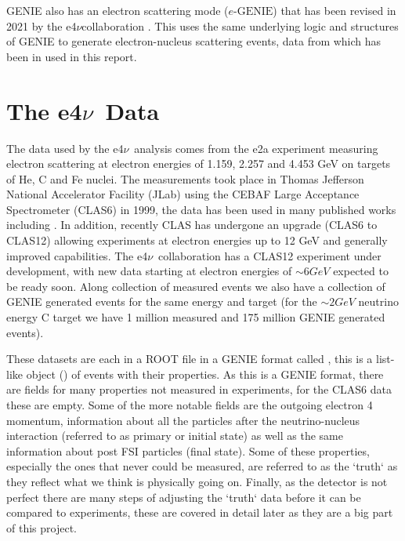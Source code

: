 \documentclass[a4paper,12pt]{article}
\newcommand{\efn}{e4$\nu$}
\newcommand{\eGEN}{$e\text{-GENIE}$}
\newcommand{\verbb}[1]{\text{\verb|#1}}
\begin{document}
GENIE also has an electron scattering mode (\eGEN) that has been revised in 2021 by the \efn collaboration \cite{e4ncollaborationInclusiveElectronScattering2021}.
This uses the same underlying logic and structures of GENIE to generate electron-nucleus scattering events, data from which has been in used in this report.

\section{The \efn\ Data}
The data used by the \efn\ analysis comes from the e2a experiment measuring electron scattering at electron energies of 1.159, 2.257 and 4.453 \si{GeV} on targets of He, C and Fe nuclei.
The measurements took place in Thomas Jefferson National Accelerator Facility (JLab) using the CEBAF Large Acceptance Spectrometer (CLAS6) \cite{meckingCEBAFLargeAcceptance2003} in 1999, the data has been used in many published works including \cite{khachatryanElectronbeamEnergyReconstruction2021}.
In addition, recently CLAS has undergone an upgrade (CLAS6 to CLAS12) \cite{burkertCLAS12SpectrometerJefferson2020} allowing experiments at electron energies up to 12 \si{GeV} and generally improved capabilities.
The \efn\ collaboration has a CLAS12 experiment under development, with new data starting at electron energies of $\sim6 \si{GeV}$ expected to be ready soon.
Along collection of measured events we also have a collection of GENIE generated events for the same energy and target (for the $\sim 2\si{GeV}$ neutrino energy C target we have 1 million measured and 175 million GENIE generated events).

These datasets are each in a ROOT file in a GENIE format called \verbb{gst}, this is a list-like object (\verbb{TTree}) of events with their properties.
As this is a GENIE format, there are fields for many properties not measured in experiments, for the CLAS6 data these are empty.
Some of the more notable fields are the outgoing electron 4 momentum, information about all the particles after the neutrino-nucleus interaction (referred to as primary or initial state) as well as the same information about post FSI particles (final state).
Some of these properties, especially the ones that never could be measured, are referred to as the `truth` as they reflect what we think is physically going on.
Finally, as the detector is not perfect there are many steps of adjusting the `truth` data before it can be compared to experiments, these are covered in detail later as they are a big part of this project.
\end{document}
